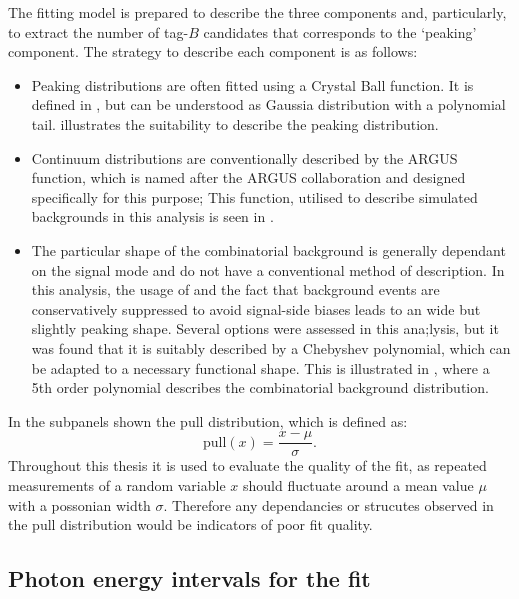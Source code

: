 The fitting model is prepared to describe the three components and, particularly, to extract the number of tag-$B$ candidates that corresponds to the `peaking' component.
The strategy to describe each component is as follows:
\begin{itemize}
    \item Peaking \Mbc distributions are often fitted using a Crystal Ball function.
    It is defined in , but can be understood as Gaussia distribution with a polynomial tail.
     illustrates the suitability to describe the peaking \Mbc distribution.
    \item Continuum \Mbc distributions are conventionally described by the ARGUS function, which is named after the ARGUS collaboration and designed specifically for this purpose;
    This function, utilised to describe \epem\ra\qqbar simulated backgrounds in this analysis is seen in .
    \item The particular shape of the combinatorial \BB background is generally dependant on the signal mode and do not have a conventional method of description.
    In this analysis, the usage of \FEI and the fact that background events are conservatively suppressed to avoid signal-side biases leads to an wide but slightly peaking shape.
    Several options were assessed in this ana;lysis, but it was found that it is suitably described by a Chebyshev polynomial, which can be adapted to a necessary functional shape.
    This is illustrated in , where a 5th order polynomial describes the combinatorial \BB background distribution.
\end{itemize}
In  the subpanels shown the pull distribution, which is defined as:
\begin{equation}\label{eq:pull_distribution}
    \mathrm{pull}(x) = \frac{x-\mu}{\sigma}. 
\end{equation}
Throughout this thesis it is used to evaluate the quality of the fit, as repeated measurements of a random variable $x$ should fluctuate around a mean value $\mu$ with a possonian width $\sigma$.
Therefore any dependancies or strucutes observed in the pull distribution would be indicators of poor fit quality. 

\subsection{Photon energy intervals for the fit}\label{sec:binning}

